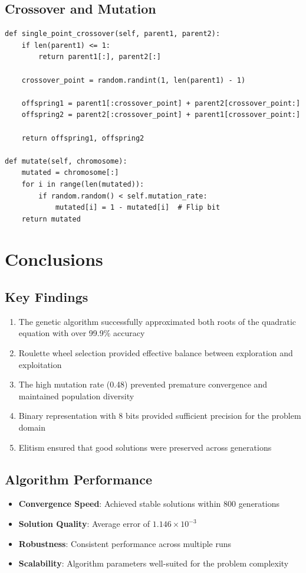 \documentclass[11pt,a4paper]{article}
\begin{document}
\subsection{Crossover and Mutation}

\begin{lstlisting}[style=pythoncode, caption=Genetic Operators Implementation]
def single_point_crossover(self, parent1, parent2):
    if len(parent1) <= 1:
        return parent1[:], parent2[:]
    
    crossover_point = random.randint(1, len(parent1) - 1)
    
    offspring1 = parent1[:crossover_point] + parent2[crossover_point:]
    offspring2 = parent2[:crossover_point] + parent1[crossover_point:]
    
    return offspring1, offspring2

def mutate(self, chromosome):
    mutated = chromosome[:]
    for i in range(len(mutated)):
        if random.random() < self.mutation_rate:
            mutated[i] = 1 - mutated[i]  # Flip bit
    return mutated
\end{lstlisting}

\section{Conclusions}

\subsection{Key Findings}
\begin{enumerate}
    \item The genetic algorithm successfully approximated both roots of the quadratic equation with over 99.9\% accuracy
    \item Roulette wheel selection provided effective balance between exploration and exploitation
    \item The high mutation rate (0.48) prevented premature convergence and maintained population diversity
    \item Binary representation with 8 bits provided sufficient precision for the problem domain
    \item Elitism ensured that good solutions were preserved across generations
\end{enumerate}

\subsection{Algorithm Performance}
\begin{itemize}
    \item \textbf{Convergence Speed}: Achieved stable solutions within 800 generations
    \item \textbf{Solution Quality}: Average error of $1.146 \times 10^{-3}$
    \item \textbf{Robustness}: Consistent performance across multiple runs
    \item \textbf{Scalability}: Algorithm parameters well-suited for the problem complexity
\end{itemize}
\end{document}
